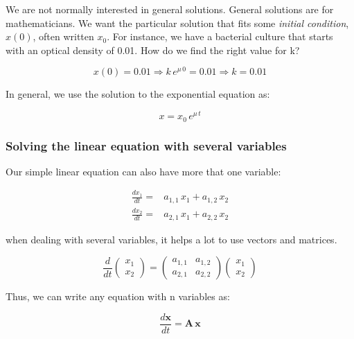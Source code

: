 \documentclass[12pt]{article}
\begin{document}
We are not normally interested in general solutions. General solutions are for mathematicians. We want the particular solution that fits some \emph{initial condition}, $x(0)$, often written $x_0$. For instance, we have a bacterial culture that starts with an optical density of 0.01. How do we find the right value for k?


\begin{equation}
x(0) = 0.01 \Rightarrow	 k \, e^{\mu \, 0} = 0.01 \Rightarrow	k=0.01 \nonumber
\end{equation}

In general, we use the solution to the exponential equation as:

\begin{equation}
	x   = x_0 \, e^{\mu \, t} \nonumber
\end{equation}

\subsubsection{Solving the linear equation with several variables}


Our simple linear equation can also have more that one variable:

\begin{align}
	\label{odenvar}
	\frac{dx_1}{dt} =& a_{1,1} \, x_1 + a_{1,2} \, x_2 \nonumber\\
	\frac{dx_2}{dt} =& a_{2,1} \, x_1 + a_{2,2} \, x_2
\end{align}

when dealing with several variables, it helps a lot to use vectors and matrices.

\begin{equation}
	\frac{d}{dt} \begin{pmatrix} x_1\\ x_2 \end{pmatrix} = \begin{pmatrix} a_{1,1} & a_{1,2}\\ a_{2,1} & a_{2,2} \end{pmatrix} \begin{pmatrix} x_1\\ x_2 \end{pmatrix} \nonumber
\end{equation}

Thus, we can write any equation with n variables as:

\begin{equation}
	\label{odenvar_mat}
	\frac{d\mathbf{x}}{dt}  = \mathbf{A} \, \mathbf{x}
\end{equation}
\end{document}
